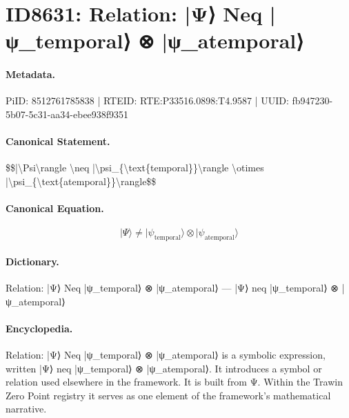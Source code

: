 \section*{ID8631: Relation: |Ψ⟩ Neq |ψ\_temporal⟩ ⊗ |ψ\_atemporal⟩}
\paragraph{Metadata.}
PiID: 8512761785838 | RTEID: RTE:P33516.0898:T4.9587 | UUID: fb947230-5b07-5c31-aa34-ebee938f9351

\paragraph{Canonical Statement.}
\$\$|\textbackslash{}Psi\textbackslash{}rangle \textbackslash{}neq |\textbackslash{}psi\_\{\textbackslash{}text\{temporal\}\}\textbackslash{}rangle \textbackslash{}otimes |\textbackslash{}psi\_\{\textbackslash{}text\{atemporal\}\}\textbackslash{}rangle\$\$

\paragraph{Canonical Equation.}
\[
|\Psi\rangle \neq |\psi_{\text{temporal}}\rangle \otimes |\psi_{\text{atemporal}}\rangle
\]

\paragraph{Dictionary.}
Relation: |Ψ⟩ Neq |ψ\_temporal⟩ ⊗ |ψ\_atemporal⟩ — |Ψ⟩ neq |ψ\_temporal⟩ ⊗ |ψ\_atemporal⟩

\paragraph{Encyclopedia.}
Relation: |Ψ⟩ Neq |ψ\_temporal⟩ ⊗ |ψ\_atemporal⟩ is a symbolic expression, written |Ψ⟩ neq |ψ\_temporal⟩ ⊗ |ψ\_atemporal⟩. It introduces a symbol or relation used elsewhere in the framework. It is built from Ψ. Within the Trawin Zero Point registry it serves as one element of the framework's mathematical narrative.
